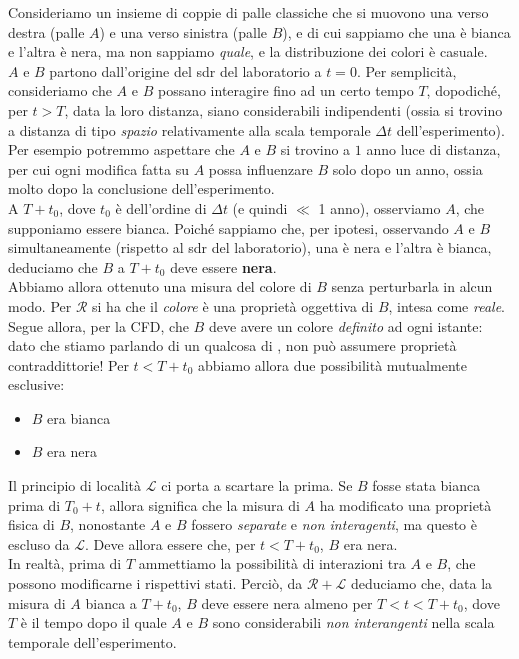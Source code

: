 \documentclass[../../FisicaTeorica.tex]{subfiles}
\begin{document}
Consideriamo un insieme di coppie di palle classiche che si muovono una verso destra (palle $A$) e una verso sinistra (palle $B$), e di cui sappiamo che una è bianca e l'altra è nera, ma non sappiamo \textit{quale}, e la distribuzione dei colori è casuale.\\
$A$ e $B$ partono dall'origine del sdr del laboratorio a $t=0$. Per semplicità, consideriamo che $A$ e $B$ possano interagire fino ad un certo tempo $T$, dopodiché, per $t>T$, data la loro distanza, siano considerabili indipendenti (ossia si trovino a distanza di tipo \textit{spazio} relativamente alla scala temporale $\Delta t$ dell'esperimento). Per esempio potremmo aspettare che $A$ e $B$ si trovino a $1$ anno luce di distanza, per cui ogni modifica fatta su $A$ possa influenzare $B$ solo dopo un anno, ossia molto dopo la conclusione dell'esperimento.\\
A $T+t_0$, dove $t_0$ è dell'ordine di $\Delta t$ (e quindi $\ll$ 1 anno), osserviamo $A$, che supponiamo essere bianca. Poiché sappiamo che, per ipotesi, osservando $A$ e $B$ simultaneamente (rispetto al sdr del laboratorio), una è nera e l'altra è bianca, deduciamo che $B$ a $T+t_0$ deve essere \textbf{nera}.\\
Abbiamo allora ottenuto una misura del colore di $B$ senza perturbarla in alcun modo. Per $\mathcal{R}$ si ha che il \textit{colore} è una proprietà oggettiva di $B$, intesa come \textit{reale}. Segue allora, per la CFD, che $B$ deve avere un colore \textit{definito} ad ogni istante: dato che stiamo parlando di un qualcosa di , non può assumere proprietà contraddittorie!
Per $t<T+t_0$ abbiamo allora due possibilità mutualmente esclusive:
\begin{itemize}
\item $B$ era bianca
\item $B$ era nera
\end{itemize}
Il principio di località $\mathcal{L}$ ci porta a scartare la prima. Se $B$ fosse stata bianca prima di $T_0+t$, allora significa che la misura di $A$ ha modificato una proprietà fisica di $B$, nonostante $A$ e $B$ fossero \textit{separate} e \textit{non interagenti}, ma questo è escluso da $\mathcal{L}$. Deve allora essere che, per $t<T + t_0$, $B$ era nera.\\
In realtà, prima di $T$ ammettiamo la possibilità di interazioni tra $A$ e $B$, che possono modificarne i rispettivi stati. Perciò, da $\mathcal{R} + \mathcal{L}$ deduciamo che, data la misura di $A$ bianca a $T+t_0$, $B$ deve essere nera almeno per $T < t < T+t_0$, dove $T$ è il tempo dopo il quale $A$ e $B$ sono considerabili \textit{non interangenti} nella scala temporale dell'esperimento.\\
\end{document}

